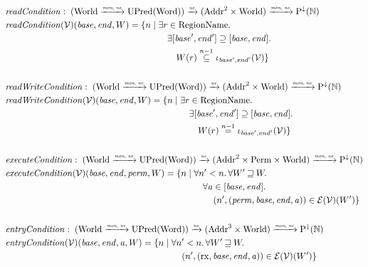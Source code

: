 \documentclass{article}
\newcommand{\monnefun}{\xrightarrow{\textit{\tiny{mon, ne}}}}
\newcommand{\nefun}{\xrightarrow{\textit{\tiny{ne}}}}
\newcommand{\nequal}[1][n]{\stackrel{\tiny{#1}}{=}}
\newcommand{\nsubeq}[1][n]{\stackrel{\tiny{#1}}{\subseteq}}
\newcommand{\var}[1]{\mathit{#1}}
\newcommand{\addr}{\var{a}}
\newcommand{\start}{\var{base}}
\newcommand{\addrend}{\var{end}}
\newcommand{\perm}{\var{perm}}
\newcommand{\plainfun}[2]{
  \ifthenelse{\equal{#2}{}}
             {\mathit{#1}}
             {\mathit{#1}(#2)}
}
\newcommand{\readCond}[1]{\plainfun{readCondition}{#1}}
\newcommand{\writeCond}[1]{\plainfun{readWriteCondition}{#1}}
\newcommand{\execCond}[1]{\plainfun{executeCondition}{#1}}
\newcommand{\entryCond}[1]{\plainfun{entryCondition}{#1}}
\newcommand{\future}{\mathbin{\sqsupseteq}}
\newcommand{\asmType}{\plaindom{AsmType}}
\newcommand{\plaindom}[1]{\mathrm{#1}}
\newcommand{\Words}{\plaindom{Word}}
\newcommand{\Addrs}{\plaindom{Addr}}
\newcommand{\nats}{\mathbb{N}}
\newcommand{\Perms}{\plaindom{Perm}}
\newcommand{\RegionNames}{\plaindom{RegionName}}
\newcommand{\Worlds}{\plaindom{World}}
\newcommand{\UPred}[1]{\plaindom{UPred}(#1)}
\newcommand{\DCPred}[1]{\plaindom{P}^\downarrow(#1)}
\newcommand{\intr}[2]{\mathcal{#1}}
\newcommand{\valueintr}[1]{\intr{V}{#1}}
\newcommand{\exprintr}[1]{\intr{E}{#1}}
\newcommand{\stdvr}{\valueintr{\asmType}}
\newcommand{\stder}{\exprintr{\asmType}}
\newcommand{\npair}[2][n]{\left(#1,#2 \right)}
\newcommand{\plainperm}[1]{\mathrm{#1}}
\newcommand{\exec}{\plainperm{rx}}
\begin{document}
\begin{align*}
  & \readCond{} : \; (\Worlds \monnefun \UPred{\Words}) \nefun (\Addrs^2 \times \Worlds) \monnefun \DCPred{\nats} \\
  & \readCond{}(\stdvr)(\start,\addrend,W) =        
  \begin{aligned}[t]
    \{ n \mid & \;\exists r \in \RegionNames \ldotp \\
              & \;\quad \exists [\start',\addrend'] \supseteq [\start,\addrend] \ldotp \\
              & \;\qquad W(r)\nsubeq[n-1] \iota_{\start',\addrend'}(\stdvr) \}
  \end{aligned}\\
 & \\
  & \writeCond{} : \; (\Worlds \monnefun \UPred{\Words}) \nefun (\Addrs^2 \times \Worlds) \monnefun \DCPred{\nats} \\
  & \writeCond{}(\stdvr)(\start,\addrend, W) = 
  \begin{aligned}[t]
    \{ n \mid & \; \exists r \in \RegionNames \ldotp \\
              & \;\quad \exists [\start',\addrend'] \supseteq [\start,\addrend] \ldotp \\
              & \; \qquad W(r) \nequal[n-1] \iota_{\start',\addrend'}(\stdvr)  \}
  \end{aligned}\\
 & \\
  & \execCond{} : \; (\Worlds \monnefun \UPred{\Words}) \nefun (\Addrs^2 \times \Perms \times \Worlds) \monnefun \DCPred{\nats} \\
  & \execCond{}(\stdvr)(\start,\addrend,\perm,W) = 
  \begin{aligned}[t]
    \{ n \mid & \; \forall n' < n \ldotp \forall W' \future W \ldotp \\
              & \; \quad \forall \addr \in [\start,\addrend] \ldotp \\
              & \; \qquad \npair[n']{(\perm,\start,\addrend,\addr)} \in \stder(\stdvr)(W') \}
  \end{aligned} \\
 & \\
  & \entryCond{} : \;  (\Worlds \monnefun \UPred{\Words}) \nefun (\Addrs^3 \times \Worlds) \monnefun \DCPred{\nats} \\
  & \entryCond{}(\stdvr)(\start,\addrend,\addr,W) =
  \begin{aligned}[t]
    \{ n \mid & \; \forall n' < n \ldotp \forall W' \future W \ldotp \\
              & \; \quad \npair[n']{(\exec,\start,\addrend,\addr)} \in \stder(\stdvr)(W') \}
  \end{aligned}
\end{align*}
\end{document}
